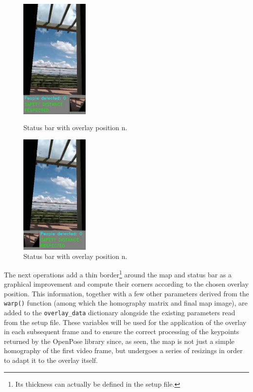 \documentclass[12pt]{article}
\begin{document}
\begin{figure}[H]
  \centering
  \begin{minipage}[b]{0.45\textwidth}
    \centering
    \includegraphics[height=6cm,keepaspectratio]{img/ovl_2.jpg}
    \caption{Status bar with overlay position n.}
    \label{fig:ovl2}
  \end{minipage}
  \hfill
  \begin{minipage}[b]{0.45\textwidth}
    \centering
    \includegraphics[height=6cm,keepaspectratio]{img/ovl_3.jpg}
    \caption{Status bar with overlay position n.}
    \label{fig:ovl3}
  \end{minipage}
\end{figure}

The next operations add a thin border\footnote{Its thickness can actually be defined in the setup file.} around the map and status bar as a graphical improvement and compute their corners according to the chosen overlay position. This information, together with a few other parameters derived from the \lstinline{warp()} function (among which the homography matrix and final map image), are added to the \lstinline{overlay_data} dictionary alongside the existing parameters read from the setup file. These variables will be used for the application of the overlay in each subsequent frame and to ensure the correct processing of the keypoints returned by the OpenPose library since, as seen, the map is not just a simple homography of the first video frame, but undergoes a series of resizings in order to adapt it to the overlay itself.
\end{document}
